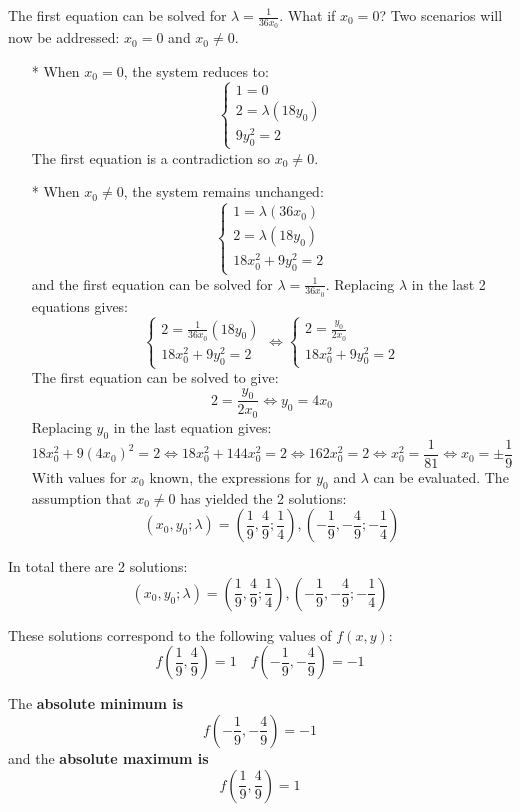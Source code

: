 \documentclass{article}
\begin{document}
\begin{itemize}
The first equation can be solved for \(\lambda = \frac{1}{36x_0}\). What if \(x_0 = 0\)? Two scenarios will now be addressed: \(x_0 = 0\) and \(x_0 \neq 0\).  
\begin{itemize}
\item[*] 
When \(x_0 = 0\), the system reduces to:
\[\left\{\begin{array}{c}
1 = 0 \\ 
2 = \lambda (18y_0) \\ 
9y_0^2 = 2
\end{array}\right.\]
The first equation is a contradiction so \(x_0 \neq 0\). 
\item[*] 
When \(x_0 \neq 0\), the system remains unchanged:
\[\left\{\begin{array}{c}
1 = \lambda (36x_0) \\ 
2 = \lambda (18y_0) \\ 
18x_0^2 + 9y_0^2 = 2
\end{array}\right.\]
and the first equation can be solved for \(\lambda = \frac{1}{36x_0}\).  
Replacing \(\lambda\) in the last 2 equations gives:
\[\left\{\begin{array}{c}
2 = \frac{1}{36x_0} (18y_0) \\ 
18x_0^2 + 9y_0^2 = 2
\end{array}\right.\iff \left\{\begin{array}{c}
2 = \frac{y_0}{2x_0} \\ 
18x_0^2 + 9y_0^2 = 2
\end{array}\right.\]
The first equation can be solved to give:
\[2 = \frac{y_0}{2x_0} \iff y_0 = 4x_0\]
Replacing \(y_0\) in the last equation gives:
\[18x_0^2 + 9(4x_0)^2 = 2 \iff 18x_0^2 + 144x_0^2 = 2 \iff 162x_0^2 = 2 \iff x_0^2 = \frac{1}{81} \iff x_0 = \pm\frac{1}{9}\]
With values for \(x_0\) known, the expressions for \(y_0\) and \(\lambda\) can be evaluated. The assumption that \(x_0 \neq 0\) has yielded the 2 solutions:
\[(x_0, y_0; \lambda) = (\frac{1}{9}, \frac{4}{9}; \frac{1}{4}), (-\frac{1}{9}, -\frac{4}{9}; -\frac{1}{4})\]
\end{itemize}
In total there are 2 solutions:
\[(x_0, y_0; \lambda) = (\frac{1}{9}, \frac{4}{9}; \frac{1}{4}), (-\frac{1}{9}, -\frac{4}{9}; -\frac{1}{4})\] 

These solutions correspond to the following values of \(f(x,y)\):
\[f(\frac{1}{9}, \frac{4}{9}) = 1 \quad f(-\frac{1}{9}, -\frac{4}{9}) = -1\]

The {\bf absolute minimum is}
\[f(-\frac{1}{9}, -\frac{4}{9}) = -1\]
and the {\bf absolute maximum is}
\[f(\frac{1}{9}, \frac{4}{9}) = 1\]


\end{itemize}
\end{document}
